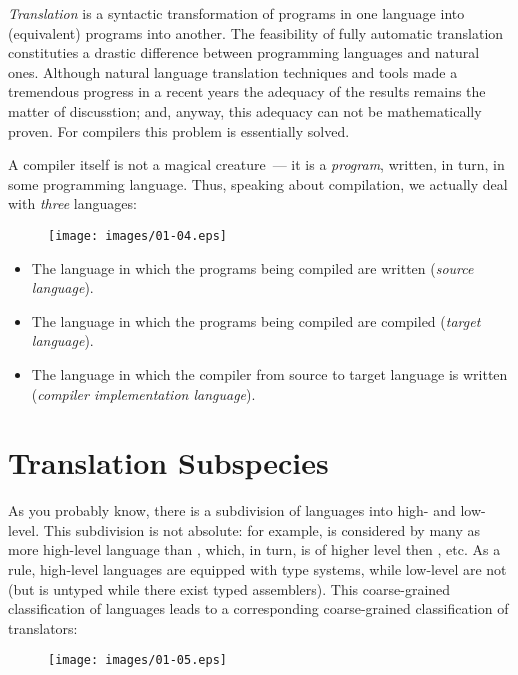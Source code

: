 \emph{Translation} is a syntactic transformation of programs in one language into (equivalent) programs into another.
The feasibility of fully automatic translation constituties a drastic difference between programming languages and natural ones.
Although natural language translation techniques and tools made a tremendous progress in a recent years the adequacy of the results
remains the matter of discusstion; and, anyway, this adequacy can not be mathematically proven. For compilers this problem
is essentially solved.

A compiler itself is not a magical creature~--- it is a \emph{program}, written, in turn, in some programming language. Thus, speaking
about compilation, we actually deal with \emph{three} languages:

\begin{figure}[h]
  \centering
  \texttt{[image: images/01-04.eps]}
\end{figure}

\begin{itemize}
\item The language in which the programs being compiled are written (\emph{source language}).
\item The language in which the programs being compiled are compiled (\emph{target language}).
\item The language in which the compiler from source to target language is written (\emph{compiler implementation language}).
\end{itemize}

\section{Translation Subspecies}

As you probably know, there is a subdivision of languages into high- and low-level. This subdivision is not absolute: for example,
 is considered by many as more high-level language than , which, in turn, is of higher level then , etc.
As a rule, high-level languages are equipped with type systems, while low-level are not (but  is untyped while there 
exist typed assemblers). This coarse-grained classification of languages leads to a corresponding coarse-grained classification of
translators:

\begin{figure}[h]
  \centering
  \texttt{[image: images/01-05.eps]}
\end{figure}

